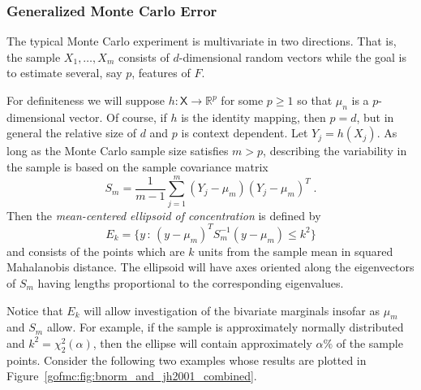 \documentclass[12pt]{article}
\theoremstyle{plain}
\theoremstyle{definition}
\theoremstyle{remark}
\newcommand{\sX}{\mathsf{X}}
\newcommand{\real}{\mathbb{R}}
\begin{document}


\subsubsection{Generalized Monte Carlo Error}
The typical Monte Carlo experiment is multivariate in two directions.
That is, the sample $X_1, \ldots, X_m$ consists of $d$-dimensional
random vectors while the goal is to estimate several, say $p$,
features of $F$.

For definiteness we will suppose $h : \sX \to \real^p$ for some
$p \ge 1$ so that $\mu_n$ is a $p$-dimensional vector. Of course, if
$h$ is the identity mapping, then $p=d$, but in general the relative
size of $d$ and $p$ is context dependent.  Let $Y_j = h(X_j)$. As long
as the Monte Carlo sample size satisfies $m > p$, describing the
variability in the sample is based on the sample covariance matrix
\begin{equation*}
S_m = \frac{1}{m-1} \sum_{j=1}^{m} (Y_{j} - \mu_m)(Y_{j} -
\mu_m)^{T} \; .
\end{equation*}
Then the \textit{mean-centered ellipsoid of concentration} is defined by
\begin{equation}
\label{gofmc:eq:ellipsoid of concentration}
E_k=\{ y \, : \, (y - \mu_m)^T S_m^{-1} (y - \mu_m) \le k^2 \}
\end{equation}
and consists of the points which are $k$ units from the sample mean in
squared Mahalanobis distance.  The ellipsoid will have axes oriented
along the eigenvectors of $S_m$ having lengths proportional to the
corresponding eigenvalues.

Notice that $E_k$ will allow investigation of the bivariate marginals
insofar as $\mu_m$ and $S_m$ allow. For example, if the sample is
approximately normally distributed and $k^2 = \chi^2_2 (\alpha)$, then
the ellipse will contain approximately $\alpha \%$ of the sample
points. Consider the following two examples whose results are plotted
in Figure~\ref{gofmc:fig:bnorm_and_jh2001_combined}.
\end{document}
